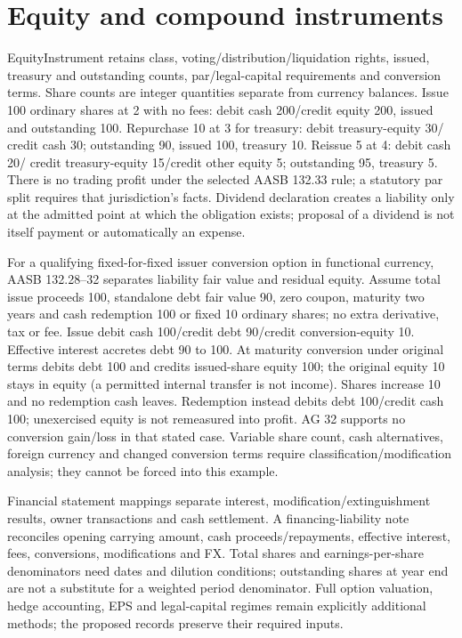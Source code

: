 \hypertarget{equity-and-compound-instruments}{%
\section{Equity and compound instruments}\label{method-financing-methods-equity-and-compound-instruments}}

EquityInstrument retains class, voting/distribution/liquidation rights, issued, treasury and outstanding counts, par/legal-capital requirements and conversion terms. Share counts are integer quantities separate from currency balances. Issue 100 ordinary shares at 2 with no fees: debit cash 200/credit equity 200, issued and outstanding 100. Repurchase 10 at 3 for treasury: debit treasury-equity 30/ credit cash 30; outstanding 90, issued 100, treasury 10. Reissue 5 at 4: debit cash 20/ credit treasury-equity 15/credit other equity 5; outstanding 95, treasury 5. There is no trading profit under the selected AASB 132.33 rule; a statutory par split requires that jurisdiction's facts. Dividend declaration creates a liability only at the admitted point at which the obligation exists; proposal of a dividend is not itself payment or automatically an expense.

For a qualifying fixed-for-fixed issuer conversion option in functional currency, AASB 132.28--32 separates liability fair value and residual equity. Assume total issue proceeds 100, standalone debt fair value 90, zero coupon, maturity two years and cash redemption 100 or fixed 10 ordinary shares; no extra derivative, tax or fee. Issue debit cash 100/credit debt 90/credit conversion-equity 10. Effective interest accretes debt 90 to 100. At maturity conversion under original terms debits debt 100 and credits issued-share equity 100; the original equity 10 stays in equity (a permitted internal transfer is not income). Shares increase 10 and no redemption cash leaves. Redemption instead debits debt 100/credit cash 100; unexercised equity is not remeasured into profit. AG 32 supports no conversion gain/loss in that stated case. Variable share count, cash alternatives, foreign currency and changed conversion terms require classification/modification analysis; they cannot be forced into this example.

Financial statement mappings separate interest, modification/extinguishment results, owner transactions and cash settlement. A financing-liability note reconciles opening carrying amount, cash proceeds/repayments, effective interest, fees, conversions, modifications and FX. Total shares and earnings-per-share denominators need dates and dilution conditions; outstanding shares at year end are not a substitute for a weighted period denominator. Full option valuation, hedge accounting, EPS and legal-capital regimes remain explicitly additional methods; the proposed records preserve their required inputs.
